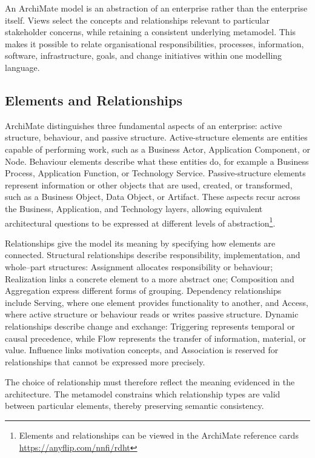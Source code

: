An ArchiMate model is an abstraction of an enterprise rather than the enterprise itself. Views select the concepts and relationships relevant to particular stakeholder concerns, while retaining a consistent underlying metamodel. This makes it possible to relate organisational responsibilities, processes, information, software, infrastructure, goals, and change initiatives within one modelling language.

\subsection{Elements and Relationships}

ArchiMate distinguishes three fundamental aspects of an enterprise: active structure, behaviour, and passive structure. Active-structure elements are entities capable of performing work, such as a Business Actor, Application Component, or Node. Behaviour elements describe what these entities do, for example a Business Process, Application Function, or Technology Service. Passive-structure elements represent information or other objects that are used, created, or transformed, such as a Business Object, Data Object, or Artifact. These aspects recur across the Business, Application, and Technology layers, allowing equivalent architectural questions to be expressed at different levels of abstraction\footnote{\label{ft:archimate32_cards}Elements and relationships can be viewed in the ArchiMate reference cards \url{https://anyflip.com/nnfi/rdht}}.\cite{opengroup}

Relationships give the model its meaning by specifying how elements are connected. Structural relationships describe responsibility, implementation, and whole–part structures: Assignment allocates responsibility or behaviour; Realization links a concrete element to a more abstract one; Composition and Aggregation express different forms of grouping. Dependency relationships include Serving, where one element provides functionality to another, and Access, where active structure or behaviour reads or writes passive structure. Dynamic relationships describe change and exchange: Triggering represents temporal or causal precedence, while Flow represents the transfer of information, material, or value. Influence links motivation concepts, and Association is reserved for relationships that cannot be expressed more precisely.\cite{opengroup}

The choice of relationship must therefore reflect the meaning evidenced in the architecture. The metamodel constrains which relationship types are valid between particular elements, thereby preserving semantic consistency.

